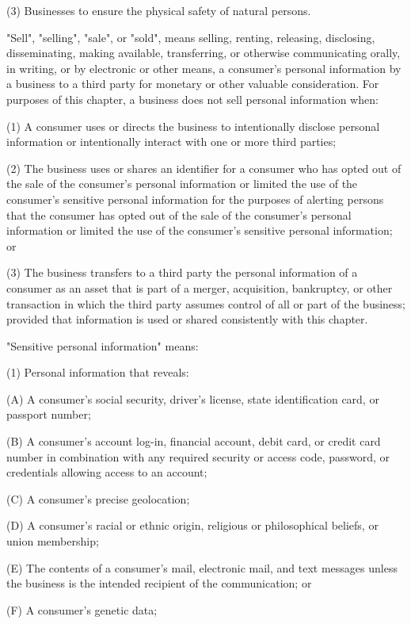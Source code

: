      (3)  Businesses to ensure the physical safety of natural persons.

     "Sell", "selling", "sale", or "sold", means selling, renting, releasing, disclosing, disseminating, making available, transferring, or otherwise communicating orally, in writing, or by electronic or other means, a consumer's personal information by a business to a third party for monetary or other valuable consideration.  For purposes of this chapter, a business does not sell personal information when:

     (1)  A consumer uses or directs the business to intentionally disclose personal information or intentionally interact with one or more third parties;

     (2)  The business uses or shares an identifier for a consumer who has opted out of the sale of the consumer's personal information or limited the use of the consumer's sensitive personal information for the purposes of alerting persons that the consumer has opted out of the sale of the consumer's personal information or limited the use of the consumer's sensitive personal information; or

     (3)  The business transfers to a third party the personal information of a consumer as an asset that is part of a merger, acquisition, bankruptcy, or other transaction in which the third party assumes control of all or part of the business; provided that information is used or shared consistently with this chapter.

     "Sensitive personal information" means:

     (1)  Personal information that reveals:

          (A)  A consumer's social security, driver's license, state identification card, or passport number;

          (B)  A consumer's account log-in, financial account, debit card, or credit card number in combination with any required security or access code, password, or credentials allowing access to an account;

          (C)  A consumer's precise geolocation;

          (D)  A consumer's racial or ethnic origin, religious or philosophical beliefs, or union membership;

          (E)  The contents of a consumer's mail, electronic mail, and text messages unless the business is the intended recipient of the communication; or

          (F)  A consumer's genetic data;

